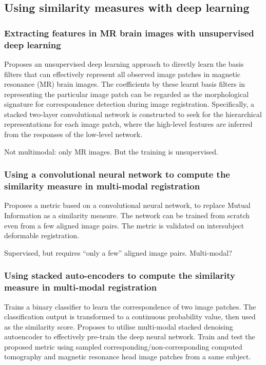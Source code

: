 \documentclass[11pt]{article} %
\begin{document}
  \subsection{Using similarity measures with deep learning \cite{litjens:deeplearning}}
    \subsubsection{Extracting features in MR brain images with unsupervised deep learning \linebreak[4] \cite{wu:features} }
Proposes an unsupervised deep learning approach to directly learn the basis filters that can effectively represent all observed image patches in magnetic resonance (MR) brain images. The coefficients by these learnt basis filters in representing the particular image patch can be regarded as the morphological signature for correspondence detection during image registration. Specifically, a stacked two-layer convolutional network is constructed to seek for the hierarchical representations for each image patch, where the high-level features are inferred from the responses of the low-level network.

Not multimodal: only MR images. But the training is unsupervised.

    \subsubsection{Using a convolutional neural network to compute the similarity measure in multi-modal registration \cite{simonovsky:crossmodalfeatures}}
Proposes a metric based on a convolutional neural network, to replace Mutual Information as a similarity measure. The network can be trained from scratch even from a few aligned image pairs. The metric is validated on intersubject deformable registration. 

Supervised, but requires ``only a few'' aligned image pairs. Multi-modal?

    \subsubsection{Using stacked auto-encoders to compute the similarity measure in multi-modal registration \cite{cheng:deepsimilarity}}
Trains a binary classifier to learn the correspondence of two image patches. The classification output is transformed to a continuous probability value, then used as the similarity score. Proposes to utilise multi-modal stacked denoising autoencoder to effectively pre-train the deep neural network. Train and test the proposed metric using sampled corresponding/non-corresponding computed tomography and magnetic resonance head image patches from a same subject. 
\end{document}

